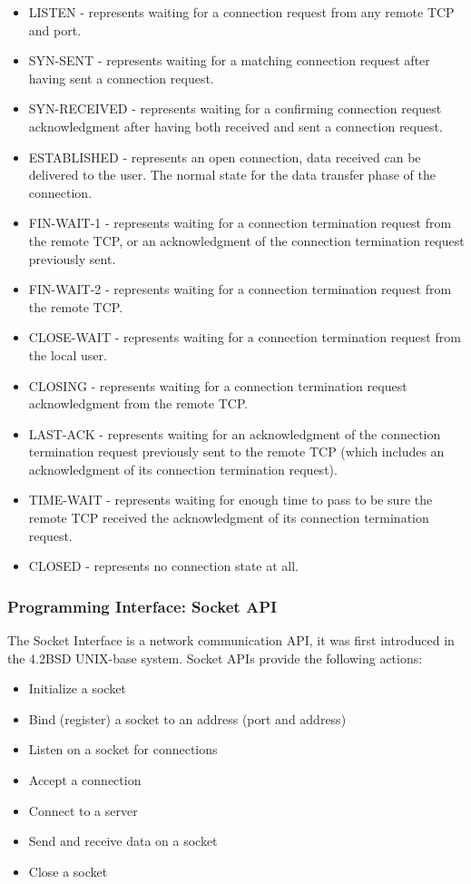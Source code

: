 \documentclass[a4paper, 11pt]{article}
\begin{document}
\begin{itemize}
\item LISTEN - represents waiting for a connection request from any remote TCP and port.
\item SYN-SENT - represents waiting for a matching connection request after having sent a connection request.
\item SYN-RECEIVED - represents waiting for a confirming connection request acknowledgment after having both received and sent a connection request.
\item ESTABLISHED - represents an open connection, data received can be delivered to the user.  The normal state for the data transfer phase of the connection.
\item FIN-WAIT-1 - represents waiting for a connection termination request from the remote TCP, or an acknowledgment of the connection termination request previously sent.
\item FIN-WAIT-2 - represents waiting for a connection termination request from the remote TCP.
\item CLOSE-WAIT - represents waiting for a connection termination request from the local user.
\item CLOSING - represents waiting for a connection termination request acknowledgment from the remote TCP.
\item LAST-ACK - represents waiting for an acknowledgment of the connection termination request previously sent to the remote TCP (which includes an acknowledgment of its connection termination request).
\item TIME-WAIT - represents waiting for enough time to pass to be sure the remote TCP received the acknowledgment of its connection termination request.
\item CLOSED - represents no connection state at all.
\end{itemize}

\subsubsection{Programming Interface: Socket API}
The Socket Interface is a network communication API, it was first introduced in the 4.2BSD UNIX-base system. Socket APIs provide the following actions:
\begin{itemize}
\item Initialize a socket
\item Bind (register) a socket to an address (port and address)
\item Listen on a socket for  connections
\item Accept a connection
\item Connect to a server
\item Send and receive data on a socket
\item Close a socket
\end{itemize}
\end{document}
